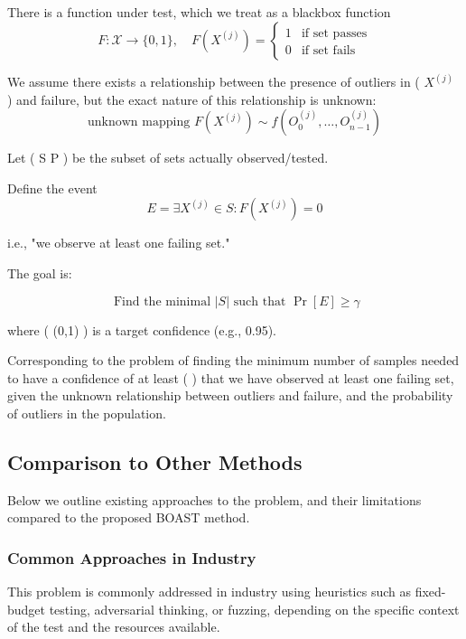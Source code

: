 
    There is a function under test, which we treat as a blackbox function
    \[
        F : \mathcal{X} \to \{0,1\}, \quad F(X^{(j)}) =
        \begin{cases}
        1 & \text{if set passes} \\
        0 & \text{if set fails}
        \end{cases}
    \]

    We assume there exists a relationship between the presence of outliers in ( $X^{(j)}$ ) and failure, but the exact nature of this relationship is unknown:
    \[
        \text{unknown mapping } F(X^{(j)}) \sim f(O_0^{(j)}, \dots, O_{n-1}^{(j)})
    \]


    Let ( S \subseteq P ) be the subset of sets actually observed/tested.

    Define the event
    \[
        E = \exists X^{(j)} \in S : F(X^{(j)}) = 0
    \]

    i.e., "we observe at least one failing set."

    The goal is:

    \[
        \text{ Find the minimal } |S| \text{ such that } \Pr[E] \ge \gamma
    \]

    where ( \gamma \in (0,1) ) is a target confidence (e.g., 0.95).

    Corresponding to the problem of finding the minimum number of samples needed to have a confidence of at least ( \gamma ) that we have observed at least one failing set, given the unknown relationship between outliers and failure, and the probability of outliers in the population.


\subsection{Comparison to Other Methods}

Below we outline existing approaches to the problem, and their limitations compared to the proposed BOAST method.

\subsubsection{Common Approaches in Industry}

    This problem is commonly addressed in industry using heuristics such as fixed-budget testing, adversarial thinking, or fuzzing, depending on the specific context of the test and the resources available.

